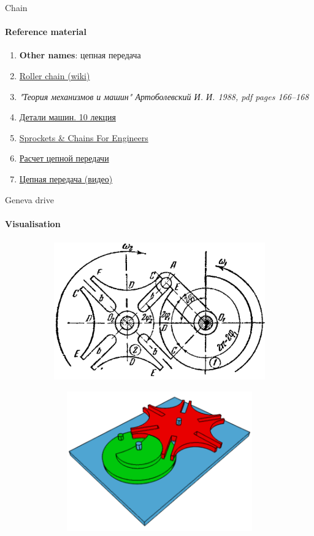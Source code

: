 \documentclass[aspectratio=169]{beamer}
\begin{document}
\begin{frame}[t]{Chain}
    \framesubtitle{Reference material}
    \begin{enumerate}
        \item \textbf{Other names}: цепная передача
        \item \href{https://en.wikipedia.org/wiki/Roller_chain}{Roller chain (wiki)}
        \item \textit{"Теория механизмов и машин" Артоболевский И. И. 1988, pdf pages 166--168 }
        \item \href{https://studfile.net/preview/2156460/}{Детали машин. 10 лекция}
        \item \href{https://www.youtube.com/watch?v=F7o3LOtKEA8}{Sprockets \& Chains For Engineers}
        \item \href{https://studfile.net/preview/4421819/page:3/}{Расчет цепной передачи}
        \item \href{https://youtu.be/ps3yeekVz5I}{Цепная передача (видео)}
    \end{enumerate}
\end{frame}

\begin{frame}[t]{Geneva drive}
    \framesubtitle{Visualisation}
    \vspace{-0.5cm}
    \begin{figure}[H]
        \begin{subfigure}{0.49\textwidth}
            \centering\includegraphics[height=6cm,width=1\textwidth,keepaspectratio]{geneva_kinematics.png}
        \end{subfigure}
        \begin{subfigure}{0.49\textwidth}
            \href{https://en.wikipedia.org/wiki/Geneva_drive\#/media/File:Geneva_mechanism_6spoke_animation.gif}{
                \centering\includegraphics[height=6cm,width=1\textwidth,keepaspectratio]{Geneva_drive_video_preview.png}}
        \end{subfigure}
    \end{figure}    
\end{frame}
\end{document}

